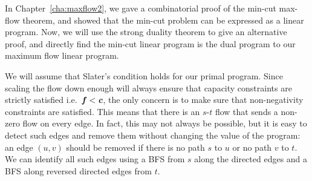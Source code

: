 \begin{example}
  In Chapter~\ref{cha:maxflow2}, we gave a combinatorial proof of the min-cut max-flow
  theorem, and showed that the min-cut problem can be expressed as a
  linear program. Now, we will use the strong duality theorem to give
  an alternative proof, and directly find the min-cut linear program
  is the dual program to our maximum flow linear program.

  We will assume that Slater's condition holds for our primal
  program.
  Since scaling the flow down enough will always ensure that
  capacity constraints are strictly satisfied i.e.\ $\boldsymbol{\mathit{f}} < \boldsymbol{\mathit{c}}$, the
  only concern is to make sure that non-negativity constraints are satisfied.
  This means that there is an $s$-$t$ flow that sends a non-zero flow
  on every edge.
  In fact, this may not always be possible, but it is
  easy to detect such edges and remove them without changing the value
  of the program: an edge $(u,v)$ should be removed if there is no
  path $s$ to $u$ or no path $v$ to $t$. We can identify all such
  edges using a BFS from $s$ along
  the directed edges and a BFS along reversed directed edges from $t$.


\end{example}
